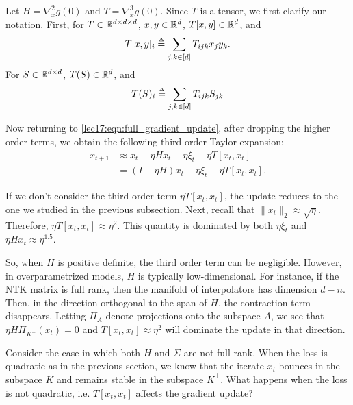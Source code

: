 Let $H = \nabla^2_x g(0)$ and $T = \nabla^3_x g(0)$. Since $T$ is a tensor, we first clarify our notation. First, for $T \in \mathbb R^{d\times d\times d}$, $x,y \in \mathbb R^{d}$, $T[x,y]\in \mathbb R^d$, and 
\begin{align}
    T[x,y]_i \defeq \sum_{j,k\in[d]}T_{ijk}x_jy_k.
\end{align} 
For $S\in \mathbb R^{d\times d}$, $T(S)\in \mathbb R^d$, and 
\begin{align} 
    T(S)_i \defeq \sum_{j,k\in[d]}T_{ijk}S_{jk}
\end{align} 

Now returning to \eqref{lec17:eqn:full_gradient_update}, after dropping the higher order terms, we obtain the following third-order Taylor expansion:
\begin{align}
x_{t+1} &\approx x_t - \eta Hx_t - \eta\xi_t - \eta T[x_t,x_t]\\
&= (I-\eta H)x_t - \eta \xi_t - \eta T [x_t,x_t].\label{lec17:eqn:iterate}
\end{align}

If we don't consider the third order term $\eta T [x_t,x_t]$, the update reduces to the one we studied in the previous subsection. Next, recall that $\|x_t\|_2 \approx \sqrt{\eta}$. Therefore, $\eta T[x_t,x_t] \approx \eta^2$. This quantity is dominated by both $\eta \xi_t$ and $\eta Hx_t \approx {\eta}^{1.5}$. 

So, when $H$ is positive definite, the third order term can be negligible. However, in overparametrized models, $H$ is typically low-dimensional. For instance, if the NTK matrix is full rank, then the manifold of interpolators has dimension $d-n$. Then, in the direction orthogonal to the span of $H$, the contraction term disappears. Letting $\Pi_{A}$ denote projections onto the subspace $A$, we see that $\eta H \Pi_{K^\perp}(x_t) = 0$ and $T[x_t,x_t] \approx \eta^2$ will dominate the update in that direction.

Consider the case in which both $H$ and $\Sigma$ are not full rank. When the loss is quadratic as in the previous section, we know that the iterate $x_t$ bounces in the subspace $K$ and remains stable in the subspace $K^\perp$. What happens when the loss is not quadratic, i.e. $T[x_t,x_t]$ affects the gradient update? 

